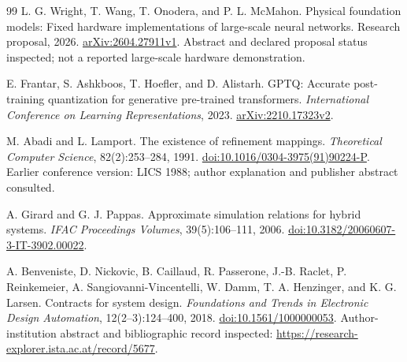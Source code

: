 \begin{thebibliography}{99}
L. G. Wright, T. Wang, T. Onodera, and P. L. McMahon. Physical foundation models: Fixed hardware implementations of large-scale neural networks. Research proposal, 2026. \href{https://arxiv.org/abs/2604.27911}{arXiv:2604.27911v1}. Abstract and declared proposal status inspected; not a reported large-scale hardware demonstration.

E. Frantar, S. Ashkboos, T. Hoefler, and D. Alistarh. GPTQ: Accurate post-training quantization for generative pre-trained transformers. \emph{International Conference on Learning Representations}, 2023. \href{https://arxiv.org/abs/2210.17323}{arXiv:2210.17323v2}.

M. Abadi and L. Lamport. The existence of refinement mappings. \emph{Theoretical Computer Science}, 82(2):253--284, 1991. \href{https://doi.org/10.1016/0304-3975(91)90224-P}{doi:10.1016/0304-3975(91)90224-P}. Earlier conference version: LICS 1988; author explanation and publisher abstract consulted.

A. Girard and G. J. Pappas. Approximate simulation relations for hybrid systems. \emph{IFAC Proceedings Volumes}, 39(5):106--111, 2006. \href{https://doi.org/10.3182/20060607-3-IT-3902.00022}{doi:10.3182/20060607-3-IT-3902.00022}.

A. Benveniste, D. Nickovic, B. Caillaud, R. Passerone, J.-B. Raclet, P. Reinkemeier, A. Sangiovanni-Vincentelli, W. Damm, T. A. Henzinger, and K. G. Larsen. Contracts for system design. \emph{Foundations and Trends in Electronic Design Automation}, 12(2--3):124--400, 2018. \href{https://doi.org/10.1561/1000000053}{doi:10.1561/1000000053}. Author-institution abstract and bibliographic record inspected: \url{https://research-explorer.ista.ac.at/record/5677}.

\end{thebibliography}
